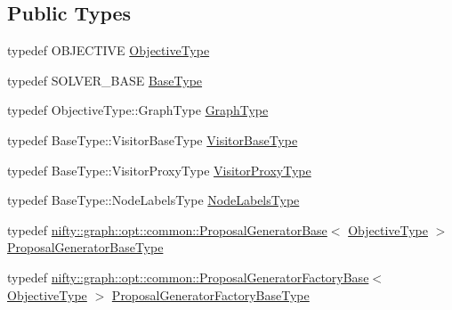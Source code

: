 \subsection*{Public Types}
\begin{DoxyCompactItemize}
\item 
typedef O\+B\+J\+E\+C\+T\+I\+VE \hyperlink{classnifty_1_1graph_1_1opt_1_1common_1_1detail__cc__fusion_1_1CcFusionMoveBasedImpl_aa9866b5feaad59ab66248cbefc28e6c0}{Objective\+Type}
\item 
typedef S\+O\+L\+V\+E\+R\+\_\+\+B\+A\+SE \hyperlink{classnifty_1_1graph_1_1opt_1_1common_1_1detail__cc__fusion_1_1CcFusionMoveBasedImpl_a3c69077e20bf0feb768a8d7719eb6999}{Base\+Type}
\item 
typedef Objective\+Type\+::\+Graph\+Type \hyperlink{classnifty_1_1graph_1_1opt_1_1common_1_1detail__cc__fusion_1_1CcFusionMoveBasedImpl_a0e280bf72fa47d1419abb10566e5f67e}{Graph\+Type}
\item 
typedef Base\+Type\+::\+Visitor\+Base\+Type \hyperlink{classnifty_1_1graph_1_1opt_1_1common_1_1detail__cc__fusion_1_1CcFusionMoveBasedImpl_a0a1c77f29d556ed955a81473884e0d82}{Visitor\+Base\+Type}
\item 
typedef Base\+Type\+::\+Visitor\+Proxy\+Type \hyperlink{classnifty_1_1graph_1_1opt_1_1common_1_1detail__cc__fusion_1_1CcFusionMoveBasedImpl_ad095e84770fba24fc09427dc862b4fe7}{Visitor\+Proxy\+Type}
\item 
typedef Base\+Type\+::\+Node\+Labels\+Type \hyperlink{classnifty_1_1graph_1_1opt_1_1common_1_1detail__cc__fusion_1_1CcFusionMoveBasedImpl_a4bcaf3e64809f68b1713161641e66c64}{Node\+Labels\+Type}
\item 
typedef \hyperlink{classnifty_1_1graph_1_1opt_1_1common_1_1ProposalGeneratorBase}{nifty\+::graph\+::opt\+::common\+::\+Proposal\+Generator\+Base}$<$ \hyperlink{classnifty_1_1graph_1_1opt_1_1common_1_1detail__cc__fusion_1_1CcFusionMoveBasedImpl_aa9866b5feaad59ab66248cbefc28e6c0}{Objective\+Type} $>$ \hyperlink{classnifty_1_1graph_1_1opt_1_1common_1_1detail__cc__fusion_1_1CcFusionMoveBasedImpl_aa8157e2e3df72161d3b767c119b57575}{Proposal\+Generator\+Base\+Type}
\item 
typedef \hyperlink{classnifty_1_1graph_1_1opt_1_1common_1_1ProposalGeneratorFactoryBase}{nifty\+::graph\+::opt\+::common\+::\+Proposal\+Generator\+Factory\+Base}$<$ \hyperlink{classnifty_1_1graph_1_1opt_1_1common_1_1detail__cc__fusion_1_1CcFusionMoveBasedImpl_aa9866b5feaad59ab66248cbefc28e6c0}{Objective\+Type} $>$ \hyperlink{classnifty_1_1graph_1_1opt_1_1common_1_1detail__cc__fusion_1_1CcFusionMoveBasedImpl_a5b8c102a697bde14691f87816956af00}{Proposal\+Generator\+Factory\+Base\+Type}
\end{DoxyCompactItemize}
